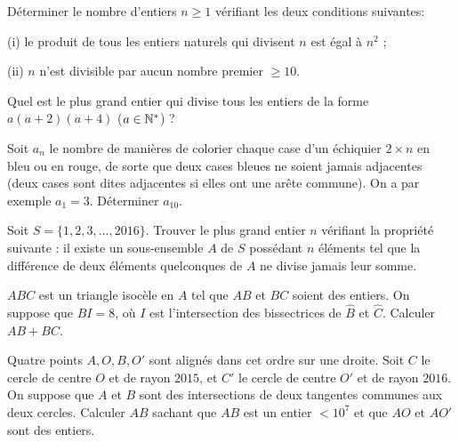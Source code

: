 \begin{exo}
 Déterminer le nombre d'entiers $n\geqslant 1$ vérifiant les deux conditions suivantes:

(i) le produit de tous les entiers naturels qui divisent $n$ est égal à $n^2$ ;

(ii) $n$ n'est divisible par aucun nombre premier $\geqslant 10$.
\end{exo}




\begin{exo}
 Quel est le plus grand entier qui divise tous les entiers de la forme $a(a+2)(a+4)$ ($a\in \mathbb{N}^*$) ?
\end{exo}



\begin{exo}
 Soit $a_n$ le nombre de manières de colorier chaque case d'un échiquier $2\times n$ en bleu ou en rouge,
de sorte que deux cases bleues ne soient jamais adjacentes (deux cases sont dites adjacentes si elles
ont une arête commune). On a par exemple $a_1=3$. Déterminer $a_{10}$.
\end{exo}



\begin{exo}
 Soit $S=\{1,2,3,\ldots,2016\}$. Trouver le plus grand entier $n$ vérifiant la propriété suivante :
il existe un sous-ensemble $A$ de $S$ possédant $n$ éléments tel que la différence de deux éléments
quelconques de $A$ ne divise jamais leur somme.
\end{exo}



\begin{exo}
 $ABC$ est un triangle isocèle en $A$ tel que $AB$ et $BC$ soient des entiers. On suppose que $BI=8$,
où $I$ est l'intersection des bissectrices de $\widehat{B}$ et $\widehat{C}$. Calculer $AB+BC$.
\end{exo}



\begin{exo}
 Quatre points $A,O,B,O'$ sont alignés dans cet ordre sur une droite. Soit $C$ le cercle de centre $O$ et
de rayon $2015$, et $C'$ le cercle de centre $O'$ et de rayon $2016$. On suppose que $A$ et $B$ sont des
intersections de deux tangentes communes aux deux cercles. Calculer $AB$ sachant que $AB$ est un entier $<10^7$
et que $AO$ et $AO'$ sont des entiers.
\end{exo}

